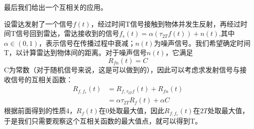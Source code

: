最后我们给出一个互相关的应用\cite{brad_osgood_ee261}。
\begin{example}[雷达测距]
    设雷达发射了一个信号$f(t)$，经过时间T信号接触到物体并发生反射，再经过时间T信号回到雷达，雷达接收到的信号$f_r(t)=\alpha (\tau_{2T}f(t))+n(t)$,其中$\alpha\in(0,1)$，表示信号在传播过程中衰减；$n(t)$为噪声信号。我们希望确定时间T，以计算雷达到物体间的距离。对于噪声信号$n(t)$，它满足
    \[R_{fn}(t)=C\]
    C为常数（对于随机信号来说，这是可以做到的），因此可以考虑求发射信号与接收信号的互相关函数：
    \begin{align*}
        R_{f,f_r}(t) & =R_{f,\tau_{2T}f}(t)+R_{fn}(t)  \\
                     & =\alpha\tau_{2T}R_f(t)+\alpha C
    \end{align*}
    根据前面得到的性质4，$R_f(t)$在0处取最大值，因此$R_{f,f_r}(t)$在$2T$处取最大值，于是我们只需要观察这个互相关函数的最大值点，就可以得到T。
\end{example}
